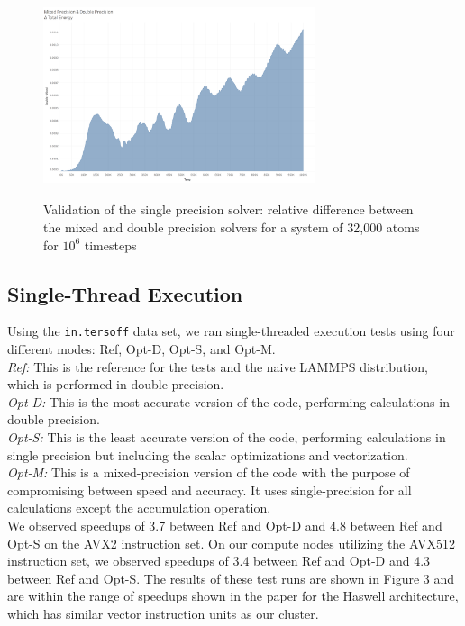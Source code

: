 \documentclass{sig-alternate-05-2015}
\begin{document}
\begin{figure}
\centering
\includegraphics[height=6cm, width=8cm]{Mixed-Double.png}
\caption{Validation of the single precision solver: relative difference between the mixed and double precision solvers for a system of 32,000 atoms for $10^{6}$ timesteps}
\vskip -6pt
\end{figure}


\subsection{Single-Thread Execution}
Using the \texttt{in.tersoff} data set, we ran single-threaded execution tests using four different modes:  Ref, Opt-D, Opt-S, and Opt-M.\\
\textit{Ref:} This is the reference for the tests and the naive LAMMPS distribution, which is performed in double precision.\\
\textit{Opt-D:} This is the most accurate version of the code, performing calculations in double precision.\\
\textit{Opt-S:} This is the least accurate version of the code, performing calculations in single precision but including the scalar optimizations and vectorization.  \\
\textit{Opt-M:} This is a mixed-precision version of the code with the purpose of compromising between speed and accuracy.  It uses single-precision for all calculations except the accumulation operation.\\
We observed speedups of 3.7 between Ref and Opt-D and 4.8 between Ref and Opt-S on the AVX2 instruction set.  On our compute nodes utilizing the AVX512 instruction set, we observed speedups of 3.4 between Ref and Opt-D and 4.3 between Ref and Opt-S. The results of these test runs are shown in Figure 3 and are within the range of speedups shown in the paper for the Haswell architecture, which has similar vector instruction units as our cluster.\\
\end{document}
